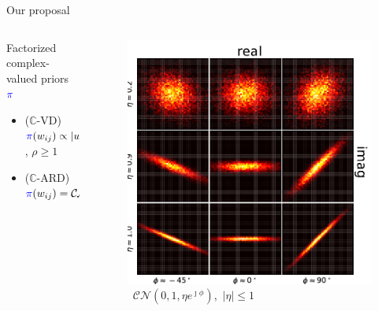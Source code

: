 \documentclass{beamer}
\newcommand{\cplx}{\mathbb{C}}
\begin{document}
\begin{frame}[c]{\insertsection}{Our proposal}
  \bigskip

  \pause
  \bigskip
  \begin{columns}[T]
    \begin{column}{0.60\linewidth}
      Factorized complex-valued priors ${\color{blue} \pi}$
      \begin{itemize}
        \item ($\cplx$-VD) $
          {\color{blue} \pi}(w_{ij})
              \propto \lvert w_{ij}\rvert^{-\rho}
        $, $\rho \geq 1$
        \smallskip
        \item ($\cplx$-ARD) $
          {\color{blue} \pi}(w_{ij})
              = \mathcal{CN}(
                0, \tfrac1{{\color{teal} \tau_{ij}}}, 0
              )
        $
      \end{itemize}
    \end{column}
    \begin{column}{0.30\linewidth}
    \vspace{-5em}
      \begin{figure}
        \centering
        \includegraphics[width=1.2\linewidth]{figure__cplx_gaussian.pdf}
        \quad\mbox{
          \scriptsize
          $\mathcal{CN}(0, 1, \eta e^{\jmath \phi})$, $\lvert \eta \rvert \leq 1$
        }
      \end{figure}
    \end{column}
  \end{columns}

\end{frame}
\end{document}
